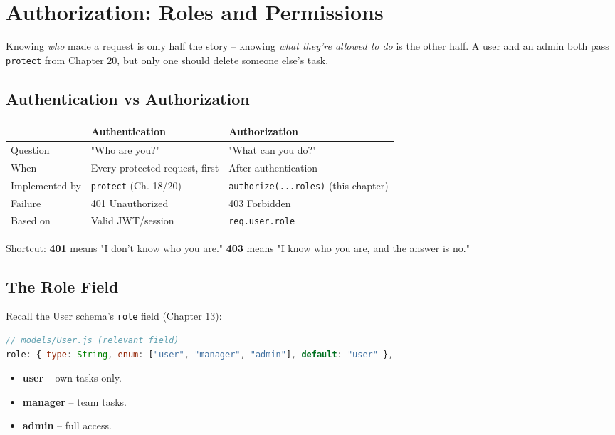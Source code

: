 \chapter{Authorization: Roles and Permissions}

Knowing \emph{who} made a request is only half the story -- knowing \emph{what they're allowed to do} is the other half. A user and an admin both pass \texttt{protect} from Chapter 20, but only one should delete someone else's task.

\section{Authentication vs Authorization}

\begin{center}
\begin{tabularx}{\textwidth}{lXX}
\toprule
\textbf{} & \textbf{Authentication} & \textbf{Authorization} \\
\midrule
Question & "Who are you?" & "What can you do?" \\
When & Every protected request, first & After authentication \\
Implemented by & \texttt{protect} (Ch. 18/20) & \texttt{authorize(...roles)} (this chapter) \\
Failure & 401 Unauthorized & 403 Forbidden \\
Based on & Valid JWT/session & \texttt{req.user.role} \\
\bottomrule
\end{tabularx}
\end{center}

\begin{notebox}[NOTE]
Shortcut: \textbf{401} means "I don't know who you are." \textbf{403} means "I know who you are, and the answer is no."
\end{notebox}

\section{The Role Field}

Recall the User schema's \texttt{role} field (Chapter 13):

\begin{lstlisting}[language=JavaScript]
// models/User.js (relevant field)
role: { type: String, enum: ["user", "manager", "admin"], default: "user" },
\end{lstlisting}

\begin{itemize}
  \item \textbf{user} -- own tasks only.
  \item \textbf{manager} -- team tasks.
  \item \textbf{admin} -- full access.
\end{itemize}

